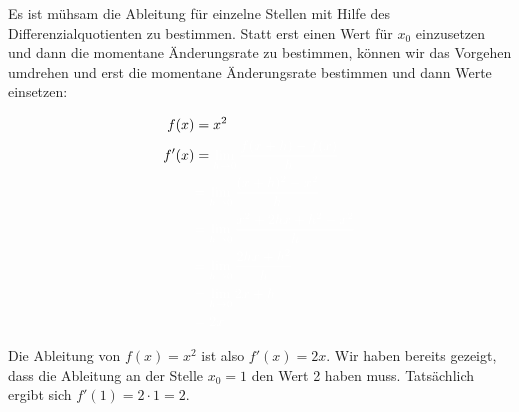 Es ist mühsam die Ableitung für einzelne Stellen mit Hilfe des Differenzialquotienten zu bestimmen. Statt erst einen Wert für \(x_0\) einzusetzen und dann die momentane Änderungsrate zu bestimmen, können wir das Vorgehen umdrehen und erst die momentane Änderungsrate bestimmen und dann Werte einsetzen:

\begin{minipage}{\textwidth}
	\begin{minipage}{0.4\textwidth}
		\begin{align*}
			f(x)&=x^2\\
			f'(x)&=\textcolor{loes}{\lim\limits_{h\to 0}\frac{f(x+h)-f(x)}{h}}\\
			&\textcolor{loes}{=\lim\limits_{h\to 0}\frac{(x+h)^2-x^2}{h}}\\
			&\textcolor{loes}{=\lim\limits_{h\to 0}\frac{x^2+2hx+h^2-x^2}{h}}\\
			&\textcolor{loes}{=\lim\limits_{h\to 0}\frac{2hx+h^2}{h}}\\
			&\textcolor{loes}{=\lim\limits_{h\to 0}2x+h}\\
			&\textcolor{loes}{=2x}
		\end{align*}
	\end{minipage}%
	\begin{minipage}{0.6\textwidth}
		\textcolor{loes}{Die Ableitung von \(f(x)=x^2\) ist also \(f'(x)=2x\). Wir haben bereits gezeigt, dass die Ableitung an der Stelle \(x_0=1\) den Wert 2 haben muss. Tatsächlich ergibt sich \(f'(1)=2\cdot 1=2\).}
	\end{minipage}%
\end{minipage}

\bigskip

